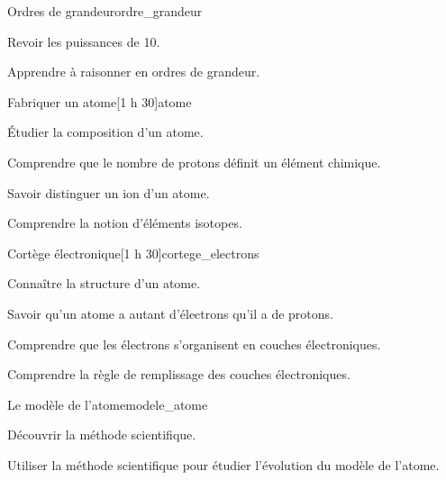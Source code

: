 \begin{multicols}{2}
  \setcounter{section}{0}
  \setcounter{activiteNum}{2}
  \begin{activite}{Ordres de grandeur}{ordre_grandeur}
    \begin{objectifs}  
      \item Revoir les puissances de 10.
      \item Apprendre à raisonner en ordres de grandeur.
    \end{objectifs}
  \end{activite}

  \vspace*{20pt}
  \setcounter{section}{5}
  \setcounter{activiteNum}{0}
  \begin{TP}{Fabriquer un atome}[1 h 30]{atome}
    \begin{objectifs}
      \item Étudier la composition d'un atome.
      \item Comprendre que le nombre de protons définit un élément chimique.
      \item Savoir distinguer un ion d'un atome.
      \item Comprendre la notion d'éléments isotopes.
    \end{objectifs}
  \end{TP}

  \medskip
  \begin{activite}{Cortège électronique}[1 h 30]{cortege_electrons}
    \begin{prerequis}
      \item Connaître la structure d'un atome.
      \item Savoir qu'un atome a autant d'électrons qu'il a de protons.
    \end{prerequis}
    \begin{objectifs}
      \item Comprendre que les électrons s'organisent en couches électroniques.
      \item Comprendre la règle de remplissage des couches électroniques.
    \end{objectifs}
  \end{activite}
  
  \begin{TP}{Le modèle de l'atome}{modele_atome}
    \begin{objectifs}
        \item Découvrir la méthode scientifique.
        \item Utiliser la méthode scientifique pour étudier l'évolution du modèle de l'atome.
    \end{objectifs}
  \end{TP}
  

\end{multicols}
